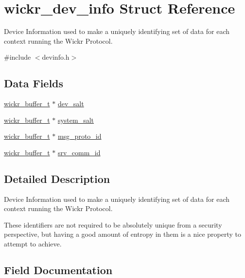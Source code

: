 \hypertarget{structwickr__dev__info}{}\section{wickr\+\_\+dev\+\_\+info Struct Reference}
\label{structwickr__dev__info}


Device Information used to make a uniquely identifying set of data for each context running the Wickr Protocol.  




{\ttfamily \#include $<$devinfo.\+h$>$}

\subsection*{Data Fields}
\begin{DoxyCompactItemize}
\item 
\mbox{\hyperlink{structwickr__buffer}{wickr\+\_\+buffer\+\_\+t}} $\ast$ \mbox{\hyperlink{structwickr__dev__info_a78032877515c2b4cf67c48e4eb6fb0f7}{dev\+\_\+salt}}
\item 
\mbox{\hyperlink{structwickr__buffer}{wickr\+\_\+buffer\+\_\+t}} $\ast$ \mbox{\hyperlink{structwickr__dev__info_a084d0cd9e73d9f74f62c9e9abb85436f}{system\+\_\+salt}}
\item 
\mbox{\hyperlink{structwickr__buffer}{wickr\+\_\+buffer\+\_\+t}} $\ast$ \mbox{\hyperlink{structwickr__dev__info_a864ad03c4d10f51fe6251059007276d2}{msg\+\_\+proto\+\_\+id}}
\item 
\mbox{\hyperlink{structwickr__buffer}{wickr\+\_\+buffer\+\_\+t}} $\ast$ \mbox{\hyperlink{structwickr__dev__info_af5f2ff06ae74fcec85106f6ffd77c008}{srv\+\_\+comm\+\_\+id}}
\end{DoxyCompactItemize}


\subsection{Detailed Description}
Device Information used to make a uniquely identifying set of data for each context running the Wickr Protocol. 

These identifiers are not required to be absolutely unique from a security perspective, but having a good amount of entropy in them is a nice property to attempt to achieve. 

\subsection{Field Documentation}
\mbox{\label{structwickr__dev__info_a78032877515c2b4cf67c48e4eb6fb0f7}} 
